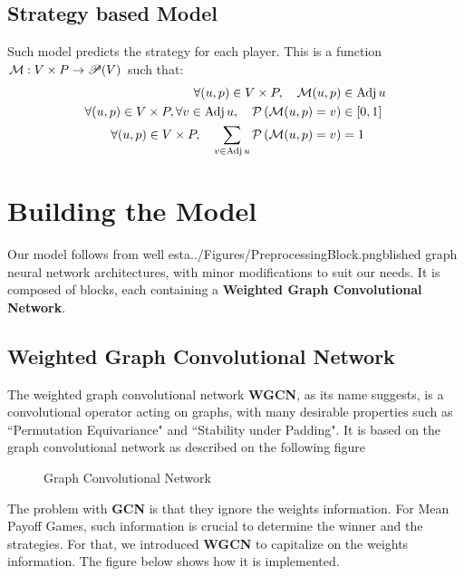 \subsection{Strategy based Model}
Such model predicts the strategy for each player.
\newline This is a function $\mathcal{M}:V \times P \rightarrow \mathscr{P}(V)$ such that:
\begin{align*}
	\forall (u,p)\in V \times P, \quad \mathcal{M}(u,p) &\in \operatorname{Adj} u \\
	\forall (u,p) \in V \times P,\forall v \in \operatorname{Adj} u, \quad  \mathcal{P}\left(\mathcal{M}(u,p) =v \right)  &\in [0,1] \\ 
\forall (u,p) \in V \times P, \quad  \sum_{v\in \operatorname{Adj} u}\mathcal{P}\left(\mathcal{M}(u,p) =v \right) &=1 \\ 
\end{align*}
\section{Building the Model}
Our model follows from well esta../Figures/PreprocessingBlock.pngblished graph neural network architectures, with minor modifications to suit our needs.
\newline It is composed of blocks, each containing a \textbf{Weighted Graph Convolutional Network}.
\subsection{Weighted Graph Convolutional Network}
The weighted graph convolutional network \textbf{WGCN}, as its name suggests, is a convolutional operator acting on graphs, with many desirable properties such as ``Permutation Equivariance" and ``Stability under Padding".
\newline It is based on the graph convolutional network as described on the following figure
\begin{figure}[H]
	\noindent
	
	\caption{Graph Convolutional Network}
	\label{fig:GCN}
\end{figure}
\FloatBarrier
The problem with \textbf{GCN} is that they ignore the weights information. For Mean Payoff Games, such information is crucial to determine the winner and the strategies.
\newline For that, we introduced \textbf{WGCN} to capitalize on the weights information. The figure below shows how it is implemented.

